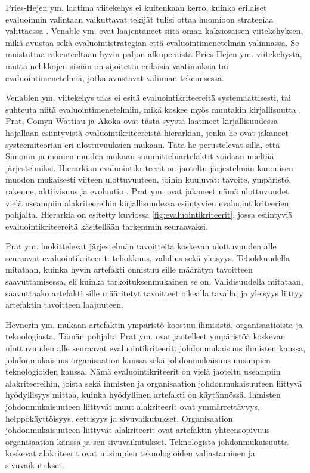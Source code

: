 \documentclass[utf8]{gradu3}
\begin{document}
Pries-Hejen ym. \parencite*{pries} laatima viitekehys ei kuitenkaan kerro, kuinka erilaiset evaluoinnin valintaan vaikuttavat tekijät tulisi ottaa huomioon strategiaa valittaessa \parencite{comprehensive}. Venable ym. \parencite*{comprehensive} ovat laajentaneet siitä oman kaksiosaisen viitekehyksen, mikä avustaa sekä evaluointistrategian että evaluointimenetelmän valinnassa. Se muistuttaa rakenteeltaan hyvin paljon alkuperäistä Pries-Hejen ym. \parencite*{pries} viitekehystä, mutta nelikkojen sisään on sijoitettu erilaisia vaatimuksia tai evaluointimenetelmiä, jotka avustavat valinnan tekemisessä. 

Venablen ym. \parencite{comprehensive} viitekehys taas ei esitä evaluointikriteereitä systemaattisesti, tai suhteuta niitä evaluointimenetelmiin, mikä koskee myös muutakin kirjallisuutta \parencite{evaluation}. Prat, Comyn-Wattiau ja Akoka \parencite*{evaluation} ovat tästä syystä laatineet kirjallisuudessa hajallaan esiintyvistä evaluointikriteereistä hierarkian, jonka he ovat jakaneet systeemiteorian eri ulottuvuuksien mukaan. Tätä he perustelevat sillä, että Simonin \parencite*{simon1996} ja monien muiden mukaan suunnitteluartefaktit voidaan mieltää järjestelmiksi. Hierarkian evaluointikriteerit on jaoteltu järjestelmän kanonisen muodon mukaisesti viiteen ulottuvuuteen, joihin kuuluvat: tavoite, ympäristö, rakenne, aktiivisuus ja evoluutio \parencite{modeling, systemic}. Prat ym. \parencite*{evaluation} ovat jakaneet nämä ulottuvuudet vielä useampiin alakriteereihin kirjallisuudessa esiintyvien evaluointikriteerien pohjalta. Hierarkia on esitetty kuviossa \ref{fig:evaluointikriteerit}, jossa esiintyviä evaluointikriteereitä käsitellään tarkemmin seuraavaksi.

Prat ym. \parencite*{evaluation} luokittelevat järjestelmän tavoitteita koskevan ulottuvuuden alle seuraavat evaluointikriteerit: tehokkuus, validius sekä yleisyys. Tehokkuudella mitataan, kuinka hyvin artefakti onnistuu sille määrätyn tavoitteen saavuttamisessa, eli kuinka tarkoituksenmukainen se on. Validisuudella mitataan, saavuttaako artefakti sille määritetyt tavoitteet oikealla tavalla, ja yleisyys liittyy artefaktin tavoitteen laajuuteen.

Hevnerin ym. \parencite*{hevner2004} mukaan artefaktin ympäristö koostuu ihmisistä, organisaatioista ja teknologiasta. Tämän pohjalta Prat ym. \parencite*{evaluation} ovat jaotelleet ympäristöä koskevan ulottuvuuden alle seuraavat evaluointikriteerit: johdonmukaisuus ihmisten kanssa, johdonmukaisuus organisaation kanssa sekä johdonmukaisuus uusimpien teknologioiden kanssa. Nämä evaluointikriteerit on vielä jaoteltu useampiin alakriteereihin, joista sekä ihmisten ja organisaation johdonmukaisuuteen liittyvä hyödyllisyys mittaa, kuinka hyödyllinen artefakti on käytännössä. Ihmisten johdonmukaisuuteen liittyvät muut alakriteerit ovat ymmärrettävyys, helppokäyttöisyys, eettisyys ja sivuvaikutukset. Organisaation johdonmukaisuuteen liittyvät alakriteerit ovat artefaktin yhteensopivuus organisaation kanssa ja sen sivuvaikutukset. Teknologista johdonmukaisuutta koskevat alakriteerit ovat uusimpien teknologioiden valjastaminen ja sivuvaikutukset. 
\end{document}
